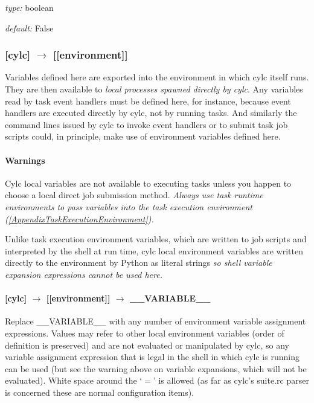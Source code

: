 \begin{myitemize}
    \item {\em type:} boolean
    \item {\em default:} False
\end{myitemize}

\subsubsection[{[[}environment{]]} ]{[cylc] $\rightarrow$ [[environment]]}

Variables defined here are exported into the environment in which cylc
itself runs. They are then available to {\em local processes spawned
directly by cylc}. Any variables read by task event handlers must be
defined here, for instance, because event handlers are executed
directly by cylc, not by running tasks. And similarly the {command
lines} issued by cylc to invoke event handlers or to submit task
job scripts could, in principle, make use of environment variables
defined here.
\paragraph{Warnings}

\begin{myitemize}
    \item Cylc local variables are not available to
        executing tasks unless you happen to choose a local direct job
        submission method.  {\em Always use task runtime environments to
        pass variables into the task execution environment
        (\ref{AppendixTaskExecutionEnvironment}).}
    \item Unlike task execution environment variables, which are written
        to job scripts and interpreted by the shell at run time,
        cylc local environment variables are written directly
        to the environment by Python as literal strings {\em  so
        shell variable expansion expressions cannot be used here.}
\end{myitemize}

\paragraph[\_\_VARIABLE\_\_ ]{[cylc] $\rightarrow$ [[environment]] $\rightarrow$ \_\_VARIABLE\_\_}

Replace \_\_VARIABLE\_\_ with any number of environment variable
assignment expressions.
Values may refer to other local environment variables (order of
definition is preserved) and are not evaluated or manipulated by
cylc, so any variable assignment expression that is legal in the
shell in which cylc is running can be used (but see the warning
above on variable expansions, which will not be evaluated).
White space around the `$=$' is allowed (as far as cylc's suite.rc
parser is concerned these are normal configuration items).

